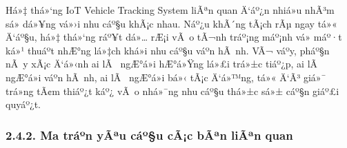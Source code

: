 \documentclass[a4paper]{extarticle}
\begin{document}
Há»‡ thá»‘ng IoT Vehicle Tracking System liÃªn quan Ä‘áº¿n nhiá»u nhÃ³m sá»­ dá»¥ng vá»›i
nhu cáº§u khÃ¡c nhau. Náº¿u khÃ´ng tÃ¡ch rÃµ ngay tá»« Ä‘áº§u, há»‡ thá»‘ng ráº¥t dá»… rÆ¡i vÃ o
tÃ¬nh tráº¡ng máº¡nh vá» máº·t ká»¹ thuáº­t nhÆ°ng lá»‡ch khá»i nhu cáº§u váº­n hÃ nh. VÃ¬ váº­y,
pháº§n nÃ y xÃ¡c Ä‘á»‹nh ai lÃ  ngÆ°á»i hÆ°á»Ÿng lá»£i trá»±c tiáº¿p, ai lÃ  ngÆ°á»i váº­n hÃ nh,
ai lÃ  ngÆ°á»i bá»‹ tÃ¡c Ä‘á»™ng, tá»« Ä‘Ã³ giá»¯ trá»ng tÃ¢m thiáº¿t káº¿ vÃ o nhá»¯ng nhu cáº§u
thá»±c sá»± cáº§n giáº£i quyáº¿t.

\subsubsection{2.4.2. Ma tráº­n yÃªu cáº§u cÃ¡c bÃªn liÃªn
quan}\label{242-ma-trux1eadn-yuxeau-cux1ea7u-cuxe1c-buxean-liuxean-quan}
\end{document}

